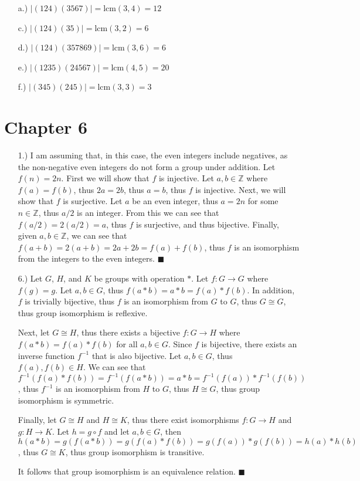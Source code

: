 \documentclass[11pt]{article}
\newcommand{\vertb}[1]{\left\vert#1\right\vert}      %
\newcommand{\Z}{\mathbb{Z}}
\begin{document}
\begin{itemize}
\begin{spacing}{1}
\begin{itemize}
        \item [a.)] $\vertb{(124)(3567)}=\text{lcm}(3,4)=12$

        \item [c.)] $\vertb{(124)(35)}=\text{lcm}(3,2)=6$

        \item [d.)] $\vertb{(124)(357869)}=\text{lcm}(3,6)=6$

        \item [e.)] $\vertb{(1235)(24567)}=\text{lcm}(4,5)=20$

        \item [f.)] $\vertb{(345)(245)}=\text{lcm}(3,3)=3$
    \end{itemize}

    \end{spacing}
\end{itemize}

\section*{Chapter 6}
\begin{itemize}
    \item [1.)] I am assuming that, in this case, the even integers include negatives, as the non-negative even integers do not form a group under addition. Let $f(n)=2n$. First we will show that $f$ is injective. Let $a,b\in\Z$ where $f(a)=f(b)$, thus $2a=2b$, thus $a=b$, thus $f$ is injective. Next, we will show that $f$ is surjective. Let $a$ be an even integer, thus $a=2n$ for some $n\in\Z$, thus $a/2$ is an integer. From this we can see that $f(a/2)=2(a/2)=a$, thus $f$ is surjective, and thus bijective. Finally, given $a,b\in\Z$, we can see that $f(a+b)=2(a+b)=2a+2b=f(a)+f(b)$, thus $f$ is an isomorphism from the integers to the even integers. $\blacksquare$
   
    \item [6.)] Let $G$, $H$, and $K$ be groups with operation $*$. Let $f:G\to G$ where $f(g)=g$. Let $a,b\in G$, thus $f(a*b)=a*b=f(a)*f(b)$. In addition, $f$ is trivially bijective, thus $f$ is an isomorphism from $G$ to $G$, thus $G\cong G$, thus group isomorphism is reflexive.

    Next, let $G\cong H$, thus there exists a bijective $f:G\to H$ where $f(a*b)=f(a)*f(b)$ for all $a,b\in G$. Since $f$ is bijective, there exists an inverse function $f^{-1}$ that is also bijective. Let $a,b\in G$, thus $f(a),f(b)\in H$. We can see that $f^{-1}(f(a)*f(b))=f^{-1}(f(a*b))=a*b=f^{-1}(f(a))*f^{-1}(f(b))$, thus $f^{-1}$ is an isomorphism from $H$ to $G$, thus  $H\cong G$, thus group isomorphism is symmetric.

    Finally, let $G\cong H$ and $H\cong K$, thus there exist isomorphisms $f:G\to H$ and $g:H\to K$. Let $h=g\circ f$ and let $a,b\in G$, then $h(a*b)=g(f(a*b))=g(f(a)*f(b))=g(f(a))*g(f(b))=h(a)*h(b)$, thus $G\cong K$, thus group isomorphism is transitive.

    It follows that group isomorphism is an equivalence relation. $\blacksquare$
\end{itemize}
\end{document}
